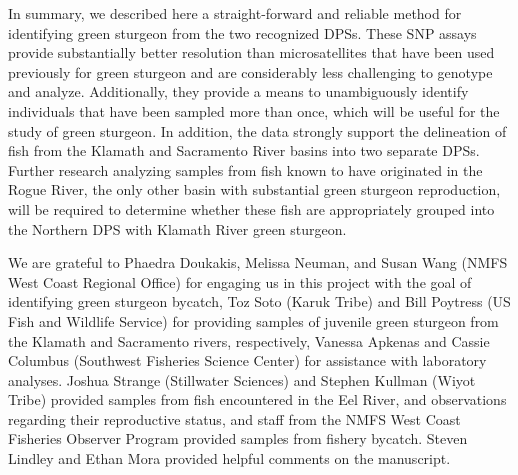In summary, we described here a straight-forward and reliable method for identifying
green sturgeon from the two recognized DPSs. These SNP assays provide substantially 
better resolution than microsatellites that have been used previously for green sturgeon \citep{Israeletal2009} 
and are considerably less challenging to genotype and analyze. 
Additionally, they provide a means to unambiguously identify individuals that have been 
sampled more than once, which will be useful for the study of green sturgeon. In addition, 
the data strongly support the delineation of fish from the Klamath and Sacramento River 
basins into two separate DPSs. Further research analyzing samples from fish known to have 
originated in the Rogue River, the only other basin with substantial green sturgeon 
reproduction, will be required to determine whether these fish are appropriately 
grouped into the Northern DPS with Klamath River green sturgeon. 









\begin{acknowledgements}
We are grateful to Phaedra Doukakis, Melissa Neuman, and Susan Wang (NMFS West Coast Regional Office) for engaging us in this project with the goal of identifying green sturgeon bycatch, Toz Soto (Karuk Tribe) and Bill Poytress (US Fish and Wildlife Service) for providing samples of juvenile green sturgeon from the Klamath and Sacramento rivers, respectively, Vanessa Apkenas and Cassie Columbus (Southwest Fisheries Science Center) for assistance with laboratory analyses. Joshua Strange (Stillwater Sciences) and Stephen Kullman (Wiyot Tribe) provided samples from fish encountered in the Eel River, and observations regarding their reproductive status, and staff from the NMFS West Coast Fisheries Observer Program provided samples from fishery bycatch. Steven Lindley and Ethan Mora provided helpful comments on the manuscript.
\end{acknowledgements}





